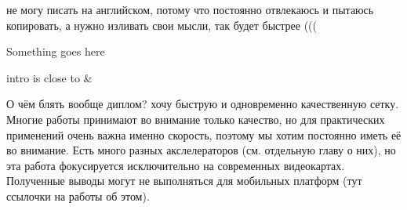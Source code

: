 не могу писать на английском, потому что постоянно отвлекаюсь и пытаюсь копировать, а нужно изливать свои мысли, так будет быстрее (((


Something goes here

intro is close to \cite{lin2020neural_genet} & \cite{ridnik2021_tresnet}

О чём блять вообще диплом? хочу быструю и одновременно качественную сетку. 
Многие работы принимают во внимание только качество, но для практических применений очень важна именно скорость, поэтому мы хотим постоянно иметь её во внимание. Есть много разных акслелераторов (см. отдельную главу о них), но эта работа фокусируется исключительно на современных видеокартах. Полученные выводы могут не выполняться для мобильных платформ (тут ссылочки на работы об этом). 